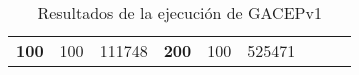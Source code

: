 \begin{table}[]
\begin{tabular}{|ccrccrccc}
\multicolumn{1}{|c|}{\multirow{-39}{*}{\cellcolor[HTML]{FFFFC7}\textbf{100}}} & \multicolumn{1}{c|}{\multirow{-9}{*}{\cellcolor[HTML]{DDFDFF}100}} & \multicolumn{1}{r|}{\cellcolor[HTML]{DAE8FC}111748}    & \multicolumn{1}{c|}{\multirow{-39}{*}{\cellcolor[HTML]{FFFFC7}\textbf{200}}} & \multicolumn{1}{c|}{\multirow{-10}{*}{\cellcolor[HTML]{DDFDFF}100}} & \multicolumn{1}{r|}{\cellcolor[HTML]{DDFDFF}525471}    &                                                                              &                                                                    &                                                        \\ \cline{1-6}
\end{tabular}
\caption{\label{GACEPv1}Resultados de la ejecución de GACEPv1}
\end{table}

